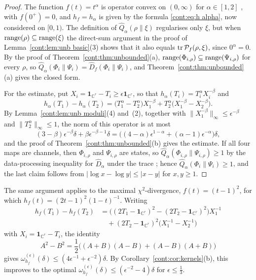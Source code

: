 \begin{proof}
The function $f(t)=t^\alpha$ is operator convex on $(0,\infty)$ for $\alpha\in[1,2]$ \cite[Chapter~V]{bhatia1997matrix}, with $f(0^+)=0$, and $h_f=h_\alpha$ is given by the formula \eqref{cont:eq:h alpha}, now considered on $[0,1)$. The definition of $\widehat{Q}_\alpha(\rho\|\xi)$ regularises only $\xi$, but when $\operatorname{range}(\rho)\subseteq\operatorname{range}(\xi)$ the direct-sum argument in the proof of Lemma~\ref{cont:lem:unb basic}(3) shows that it also equals $\operatorname{tr}\mathcal{P}_f(\rho,\xi)$, since $0^\alpha=0$. By the proof of Theorem~\ref{cont:thm:unbounded}(a), $\operatorname{range}(\Phi_{i,\rho})\subseteq\operatorname{range}(\Psi_{i,\rho})$ for every $\rho$, so $\widehat{Q}_\alpha(\Phi_i\|\Psi_i)=\widehat{D}_f(\Phi_i\|\Psi_i)$, and Theorem~\ref{cont:thm:unbounded}(a) gives the closed form.

For the estimate, put $X_i=\mathbf{1}_{\mathbb{C}^r}-T_i\geq\epsilon\mathbf{1}_{\mathbb{C}^r}$, so that $h_\alpha(T_i)=T_i^\alpha X_i^{-\beta}$ and
\[
h_\alpha(T_1)-h_\alpha(T_2)=\big(T_1^\alpha-T_2^\alpha\big)X_1^{-\beta}+T_2^\alpha\big(X_1^{-\beta}-X_2^{-\beta}\big).
\]
By Lemma~\ref{cont:lem:unb moduli}(4) and~(2), together with $\|X_1^{-\beta}\|_\infty\leq\epsilon^{-\beta}$ and $\|T_2^\alpha\|_\infty\leq1$, the norm of this operator is at most
\[
(3-\beta)\epsilon^{-\beta}\delta+\beta\epsilon^{-\beta-1}\delta=\big((4-\alpha)\epsilon^{1-\alpha}+(\alpha-1)\epsilon^{-\alpha}\big)\delta,
\]
and the proof of Theorem~\ref{cont:thm:unbounded}(b) gives the estimate. If all four maps are channels, then $\Phi_{i,\rho}$ and $\Psi_{i,\rho}$ are states, so $\widehat{Q}_\alpha(\Phi_{i,\rho}\|\Psi_{i,\rho})\geq1$ by the data-processing inequality for $\widehat{D}_\alpha$ under the trace \cite{KatariyaWilde2021}; hence $\widehat{Q}_\alpha(\Phi_i\|\Psi_i)\geq1$, and the last claim follows from $|\log x-\log y|\leq|x-y|$ for $x,y\geq1$.
\end{proof}

\begin{remark}
The same argument applies to the maximal $\chi^2$-divergence, $f(t)=(t-1)^2$, for which $h_f(t)=(2t-1)^2(1-t)^{-1}$. Writing
\begin{align*}
h_f(T_1)-h_f(T_2)&=\big((2T_1-\mathbf{1}_{\mathbb{C}^r})^2-(2T_2-\mathbf{1}_{\mathbb{C}^r})^2\big)X_1^{-1}\\
&\quad+(2T_2-\mathbf{1}_{\mathbb{C}^r})^2\big(X_1^{-1}-X_2^{-1}\big)
\end{align*}
with $X_i=\mathbf{1}_{\mathbb{C}^r}-T_i$, the identity
\[
A^2-B^2=\frac12\big((A+B)(A-B)+(A-B)(A+B)\big)
\]
gives $\omega^{(\epsilon)}_{h_f}(\delta)\leq(4\epsilon^{-1}+\epsilon^{-2})\delta$. By Corollary~\ref{cont:cor:kernels}(b), this improves to the optimal $\omega^{(\epsilon)}_{h_f}(\delta)\leq(\epsilon^{-2}-4)\delta$ for $\epsilon\leq\frac13$.
\end{remark}

